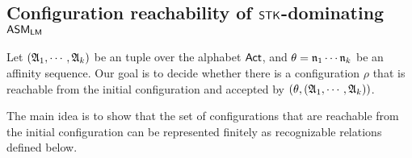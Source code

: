 




\subsection{Configuration reachability of $\mathsf{STK}$-dominating $\textsf{ASM}_\textsf{LM}$}
  
Let $({\mathfrak{A} }_1,\cdots,{\mathfrak{A} }_k)$ be an {\NFA} tuple over the alphabet ${\sf Act}$, and $\theta = \mathfrak{n}_1\cdots\mathfrak{n}_k$ be an affinity sequence. 
Our goal is to decide whether there is a configuration $\rho$ that is reachable from the initial configuration and accepted by $(\theta, ({\mathfrak{A} }_1,\cdots,{\mathfrak{A} }_k))$.

The main idea is to show that the set of configurations that are reachable from the initial configuration can be represented finitely as recognizable relations defined below. 


